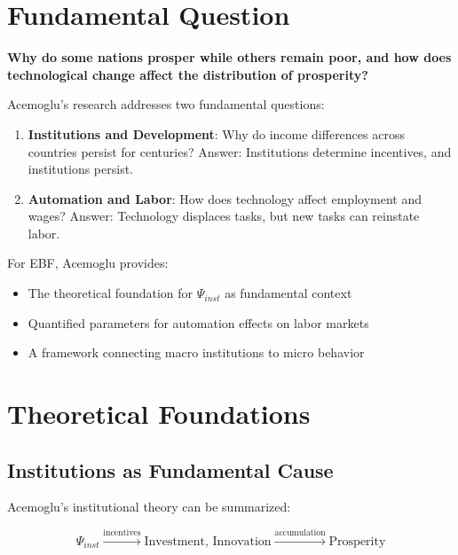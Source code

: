 \section{Fundamental Question}

\begin{tcolorbox}[colback=red!5!white,colframe=red!75!black,title=Central Question]
\textbf{Why do some nations prosper while others remain poor, and how does technological change affect the distribution of prosperity?}
\end{tcolorbox}

Acemoglu's research addresses two fundamental questions:

\begin{enumerate}
    \item \textbf{Institutions and Development}: Why do income differences across countries persist for centuries? Answer: Institutions determine incentives, and institutions persist.
    \item \textbf{Automation and Labor}: How does technology affect employment and wages? Answer: Technology displaces tasks, but new tasks can reinstate labor.
\end{enumerate}

For EBF, Acemoglu provides:
\begin{itemize}
    \item The theoretical foundation for $\Psi_{inst}$ as fundamental context
    \item Quantified parameters for automation effects on labor markets
    \item A framework connecting macro institutions to micro behavior
\end{itemize}

\section{Theoretical Foundations}

\subsection{Institutions as Fundamental Cause}

Acemoglu's institutional theory can be summarized:

\begin{equation}
\Psi_{inst} \xrightarrow{\text{incentives}} \text{Investment, Innovation} \xrightarrow{\text{accumulation}} \text{Prosperity}
\end{equation}

